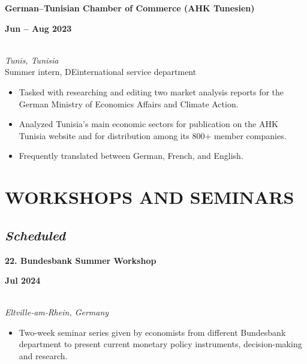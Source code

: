 \documentclass[a4paper,9pt]{extarticle}
\begin{document}
\noindent
\begin{minipage}[t]{0.7\textwidth}
  \textbf{German--Tunisian Chamber of Commerce (AHK Tunesien)}
\end{minipage}
\begin{minipage}[t]{0.3\textwidth}
  \raggedleft \textbf{Jun -- Aug 2023}
\end{minipage}
\\
\textit{Tunis, Tunisia} \\ 
Summer intern, DEinternational service department 
\begin{itemize}[noitemsep, topsep=0pt, left=0.65cm]
    \item Tasked with researching and editing two market analysis reports for the German Ministry of Economics Affairs and Climate Action.
    \item Analyzed Tunisia's main economic sectors for publication on the AHK Tunisia website and for distribution among its 800+ member companies. 
    \item Frequently translated between German, French, and English. \\
\end{itemize} 


\section*{WORKSHOPS AND SEMINARS}

\subsection*{\textit{Scheduled}}
\begin{minipage}[t]{0.7\textwidth}
  \textbf{22. Bundesbank Summer Workshop}
\end{minipage}
\begin{minipage}[t]{0.3\textwidth}
  \raggedleft \textbf{Jul 2024}
\end{minipage}
\\
\textit{Eltville-am-Rhein, Germany} 
\begin{itemize}[noitemsep, topsep=0pt, left=0.65cm]
    \item Two-week seminar series given by economists from different Bundesbank department to present current monetary policy instruments, decision-making and research. \\
\end{itemize} 
\end{document}
